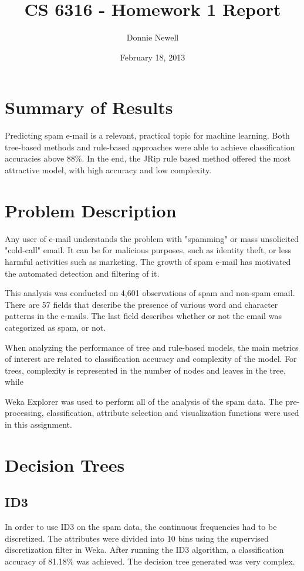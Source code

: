 \documentclass[11pt]{article}
\begin{document}
\title{CS 6316 - Homework 1 Report}
\author{Donnie Newell}
\date{February 18, 2013}
\maketitle


\section{Summary of Results}
Predicting spam e-mail is a relevant, practical topic for machine learning. Both tree-based methods and rule-based approaches were able to achieve classification accuracies above 88\%. In the end, the JRip rule based method offered the most attractive model, with high accuracy and low complexity.
\section{Problem Description}
Any user of e-mail understands the problem with "spamming" or mass unsolicited "cold-call" email. It can be for malicious purposes, such as identity theft, or less harmful activities such as marketing. The growth of spam e-mail has motivated the automated detection and filtering of it.

This analysis was conducted on 4,601 observations of spam and non-spam email. There are 57 fields that describe the presence of various word and character patterns in the e-mails. The last field describes whether or not the email was categorized as spam, or not. 

When analyzing the performance of tree and rule-based models, the main metrics of interest are related to classification accuracy and complexity of the model. For trees, complexity is represented in the number of nodes and leaves in the tree, while 

 Weka Explorer \cite{Halletal2009} was used to perform all of the analysis of the spam data. The pre-processing, classification, attribute selection and visualization functions were used in this assignment.
 
\section{Decision Trees}
\subsection{ID3}
In order to use ID3 on the spam data, the continuous frequencies had to be discretized. The attributes were divided into 10 bins using the supervised discretization filter in Weka. After running the ID3 algorithm, a classification accuracy of 81.18\% was achieved. The decision tree generated was very complex. 
\end{document}
